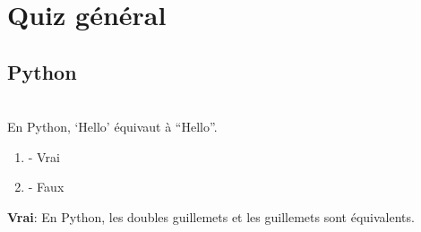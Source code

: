 \begin{Exercice}[15 minutes]
    \begin{solution}
        
    \end{solution}
    \begin{solution}
        
    \end{solution}
    \end{Exercice}
    
  
    
\section{Quiz général}

\subsection{Python}

\begin{Exercice}[2 minutes]\\
En Python, `Hello' équivaut à ``Hello''. 

\begin{enumerate}
    \item - Vrai
    \item - Faux
\end{enumerate}
\begin{solution}
    \textbf{Vrai}: En Python, les doubles guillemets et les guillemets sont équivalents. 
\end{solution}
\end{Exercice}


